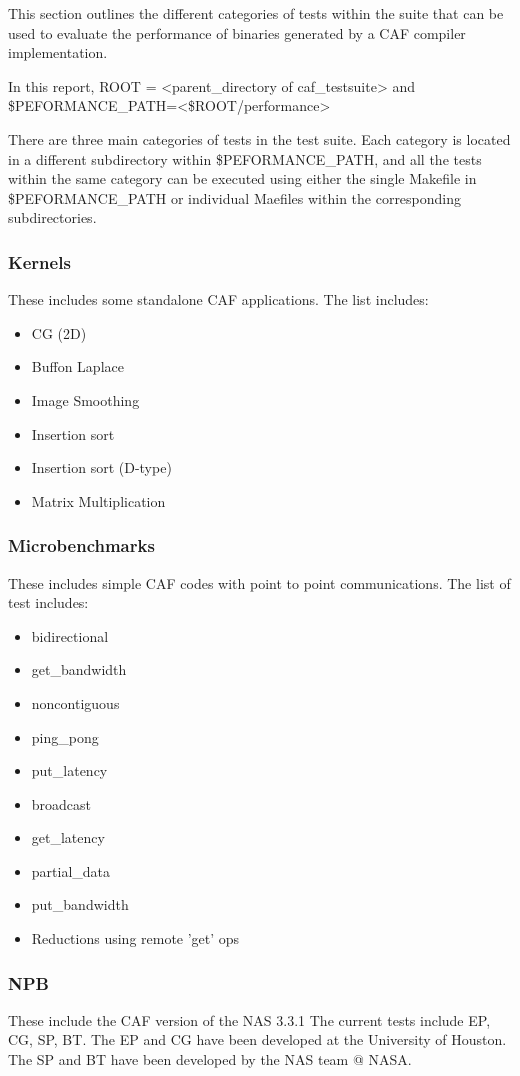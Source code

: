 This section outlines the different categories of tests within the suite that can be used to evaluate the performance of binaries generated by a CAF compiler
implementation. 

In this report, ROOT = <parent\_directory of caf\_testsuite> and \$PEFORMANCE\_PATH=<\$ROOT/performance>

There are three main categories of tests in the test suite. Each category is located in a different subdirectory within \$PEFORMANCE\_PATH, and all the tests within the same category can be executed using either the single Makefile in \$PEFORMANCE\_PATH or individual Maefiles within the corresponding subdirectories. 

\subsubsection{Kernels}
These includes some standalone CAF applications. The list includes:
\begin{itemize}
\item CG (2D)
\item Buffon Laplace
\item Image Smoothing
\item Insertion sort
\item Insertion sort (D-type)
\item Matrix Multiplication
\end{itemize}

\subsubsection{Microbenchmarks}
These includes simple CAF codes with point to point communications. The list of test includes:
\begin{itemize}
\item bidirectional
\item get\_bandwidth
\item noncontiguous
\item ping\_pong    
\item put\_latency
\item broadcast
\item get\_latency
\item partial\_data
\item put\_bandwidth
\item Reductions using remote 'get' ops 
\end{itemize}

\subsubsection{NPB}
These include the CAF version of the NAS 3.3.1 The current tests include EP, CG, SP, BT. The EP and CG have been developed at the University of Houston. The SP and BT have been developed by the NAS team @ NASA.



